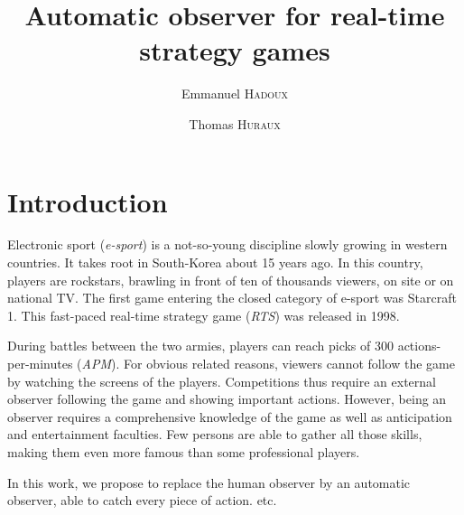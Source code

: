 \documentclass{article}
\title{Automatic observer for real-time strategy games}
\author{Emmanuel \textsc{Hadoux} \and Thomas \textsc{Huraux}}
\date{}
\begin{document}
	\maketitle

	\section{Introduction}
    	Electronic sport (\textit{e-sport}) is a not-so-young discipline slowly growing in western countries.
        It takes root in South-Korea about 15 years ago. 
        In this country, players are rockstars, brawling in front of ten of thousands viewers, on site or on national TV. %
        The first game entering the closed category of e-sport was Starcraft 1. %
        This fast-paced real-time strategy game (\textit{RTS}) was released in 1998.
        
        During battles between the two armies, players can reach picks of 300 actions-per-minutes (\textit{APM}).
        For obvious related reasons, viewers cannot follow the game by watching the screens of the players.
        Competitions thus require an external observer following the game and showing important actions.
        However, being an observer requires a comprehensive knowledge of the game as well as anticipation and entertainment faculties. 
        Few persons are able to gather all those skills, making them even more famous than some professional players.
        
        \medskip
        In this work, we propose to replace the human observer by an automatic observer, able to catch every piece of action.
        etc.
\end{document}
